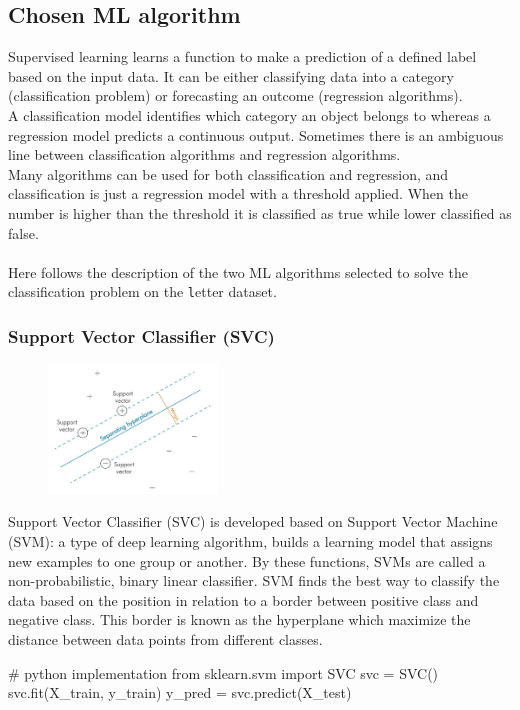 \documentclass{article}
\begin{document}
\subsection{Chosen ML algorithm}\label{sec:model}
Supervised learning learns a function to make a prediction of a defined label based on the input data. It can be either classifying data into a category (classification problem) or forecasting an outcome (regression algorithms).\\
A classification model identifies which category an object belongs to whereas a regression model predicts a continuous output. Sometimes there is an ambiguous line between classification algorithms and regression algorithms.\\
Many algorithms can be used for both classification and regression, and classification is just a regression model with a threshold applied. When the number is higher than the threshold it is classified as true while lower classified as false. \\\\
Here follows the description of the two ML algorithms selected to solve the classification problem on the {\texttt letter} dataset.
\newpage
\subsubsection*{Support Vector Classifier (SVC)}
\begin{multicols}{2}
\begin{figure}[H]
        \begin{center}
        \includegraphics[width=0.4\textwidth]{SVC.jpeg}
        \end{center}
    \end{figure} 
    \columnbreak
\columnbreak
Support Vector Classifier (SVC) is developed based on Support Vector Machine (SVM): a type of deep learning algorithm, builds a learning model that assigns new examples to one group or another. By these functions, SVMs are called a non-probabilistic, binary linear classifier. SVM finds the best way to classify the data based on the position in relation to a border between positive class and negative class. This border is known as the hyperplane which maximize the distance between data points from different classes.
\end{multicols}
\begin{center}
\begin{Python}
# python implementation 
from sklearn.svm import SVC
svc = SVC()
svc.fit(X_train, y_train)
y_pred = svc.predict(X_test)
\end{Python}
\end{center}
\end{document}
